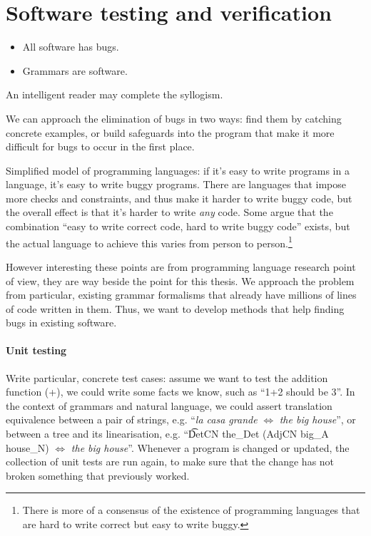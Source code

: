 \section{Software testing and verification}
\label{sec:testing-intro} 


\begin{itemize}
\item All software has bugs.
\item Grammars are software.
\end{itemize}

An intelligent reader may complete the syllogism.

We can approach the elimination of bugs in two ways: find them by
catching concrete examples, or build safeguards into the program that
make it more difficult for bugs to occur in the first place.

Simplified model of programming languages: if it's easy to write
programs in a language, it's easy to write buggy programs. There are
languages that impose more checks and constraints, and thus make it
harder to write buggy code, but the overall effect is that it's harder
to write \emph{any} code. Some argue that the combination ``easy to
write correct code, hard to write buggy code'' exists, but the actual
language to achieve this varies from person to person.\footnote{There
  is more of a consensus of the existence of programming languages
  that are hard to write correct but easy to write buggy.} 

However interesting these points are from programming language
research point of view, they are way beside the point for this
thesis. We approach the problem from particular, existing grammar
formalisms that already have millions of lines of code written in
them. Thus, we want to develop methods that help finding bugs in
existing software. 



\paragraph{Unit testing}

Write particular, concrete test cases: assume we want to test the
addition function (+), we could write some facts we know, such as
``1+2 should be 3''. In the context of grammars and natural language,
we could assert translation equivalence between a pair of strings,
e.g. ``\emph{la casa grande} $\Leftrightarrow$ \emph{the big house}'',
or between a tree and its linearisation, e.g. ``\t{DetCN the\_Det
  (AdjCN  big\_A house\_N)} $\Leftrightarrow$ \emph{the big house}''.
Whenever a program is changed or updated, the collection of unit tests
are run again, to make sure that the change has not broken something
that previously worked.

